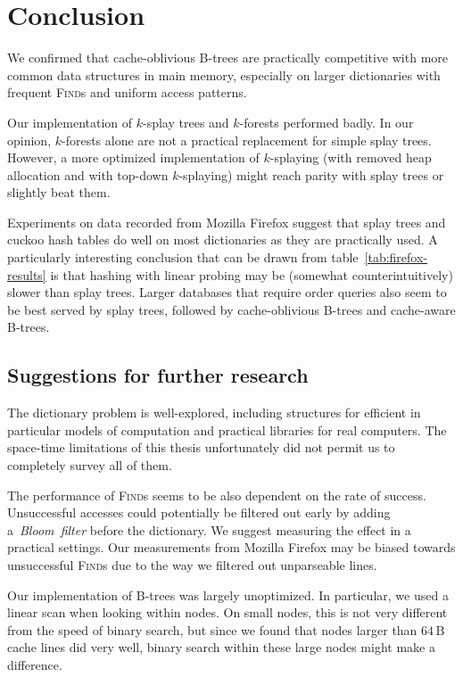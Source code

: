 \chapter*{Conclusion}

We confirmed that cache-oblivious B-trees are practically competitive with
more common data structures in main memory, especially on larger dictionaries
with frequent \textsc{Find}s and uniform access patterns.

Our implementation of $k$-splay trees and $k$-forests performed badly.
In our opinion, $k$-forests alone are not a practical replacement for simple
splay trees. However, a more optimized implementation of $k$-splaying
(with removed heap allocation and with top-down $k$-splaying) might reach
parity with splay trees or slightly beat them.

Experiments on data recorded from Mozilla Firefox suggest that splay trees
and cuckoo hash tables do well on most dictionaries as they are practically
used. A particularly interesting conclusion that can be drawn from
table~\ref{tab:firefox-results} is that hashing with linear probing may
be (somewhat counterintuitively) slower than splay trees.
Larger databases that require order queries also seem to be best served
by splay trees, followed by cache-oblivious \mbox{B-trees} and cache-aware
\mbox{B-trees}.

\section*{Suggestions for further research}
The dictionary problem is well-explored, including structures for efficient
in particular models of computation and practical libraries for real computers.
The space-time limitations of this thesis unfortunately did not permit us to
completely survey all of them.

The performance of \textsc{Find}s seems to be also dependent on
the rate of success. Unsuccessful accesses could potentially be filtered out
early by adding a~\emph{Bloom~filter} before the dictionary. We suggest
measuring the effect in a practical settings. Our measurements from Mozilla
Firefox may be biased towards unsuccessful \textsc{Find}s due to the way we
filtered out unparseable lines.

Our implementation of \mbox{B-trees} was largely unoptimized. In particular,
we used a linear scan when looking within nodes. On small nodes, this is
not very different from the speed of binary search, but since we found
that nodes larger than $64\,\text{B}$ cache lines did very well, binary search
within these large nodes might make a difference.

